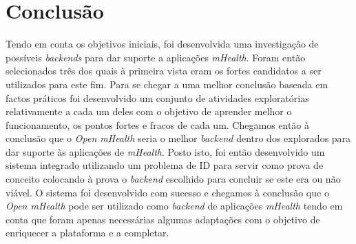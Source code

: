 \chapter{Conclusão}


Tendo em conta os objetivos iniciais, foi desenvolvida uma investigação de possíveis \textit{backends} para dar suporte a aplicações \textit{mHealth}. Foram então selecionados três dos quais à primeira vista eram os fortes candidatos a ser utilizados para este fim. Para se chegar a uma melhor conclusão baseada em factos práticos foi desenvolvido um conjunto de atividades exploratórias relativamente a cada um deles com o objetivo de aprender melhor o funcionamento, os pontos fortes e fracos de cada um. Chegamos então à conclusão que o \textit{Open mHealth} seria o melhor \textit{backend} dentro dos explorados para dar suporte às aplicações de \textit{mHealth}.
Posto isto, foi então desenvolvido um sistema integrado utilizando um problema de \gls{ID} para servir como prova de conceito colocando à prova o \textit{backend} escolhido para concluir se este era ou não viável.
O sistema foi desenvolvido com sucesso e chegamos à conclusão que o \textit{Open mHealth} pode ser utilizado como \textit{backend} de aplicações \textit{mHealth} tendo em conta que foram apenas necessárias algumas adaptações com o objetivo de enriquecer a plataforma e a completar.


